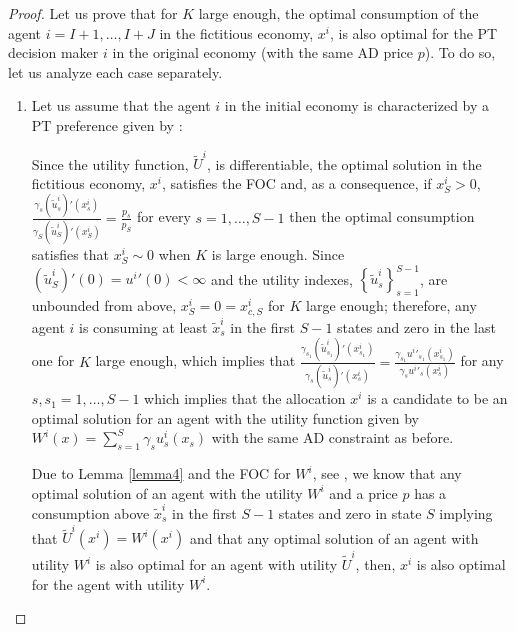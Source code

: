 \documentclass[pdftex]{article}
\numberwithin{equation}{section}
\theoremstyle{th}
\newtheorem{proof lemma}{{Proof Lemma}.}
\theoremstyle{definition}
\begin{document}
{\begin{proof}
Let us prove that for $K$ large enough, the optimal consumption
of the agent $i=I+1,\dots,I+J$ in the fictitious economy, $x^i$, is also optimal for the PT decision maker $i$ in the original
economy (with the same AD price $p$). To do so, let us analyze each case separately.
\begin{enumerate}
\item Let us assume that the agent $i$ in the initial economy is characterized
by a PT preference given by \cite{KT92}:

Since the utility function, $\tilde{U}^i$, is differentiable, the
optimal solution in the fictitious economy, $x^{i}$, satisfies
the FOC and, as a consequence, if $x_{S}^{i}>0$, $\frac{\gamma_{s}{\left(\tilde{u}_{s}^{i}\right)}'\left(x_{s}^{i}\right)}{\gamma_{S}{\left(\tilde{u}_{S}^{i}\right)}'\left(x_{S}^{i}\right)}=\frac{p_{s}}{p_{S}}$
for every $s=1,\dots,S-1$ then the optimal consumption satisfies that
$x_{S}^{i}\sim0$ when $K$ is large enough. Since $(\tilde{u}_{S}^{i})'(0)={u^{i}}'(0)<\infty$
and the utility indexes, $\left\{ \tilde{u}_{s}^{i}\right\} _{s=1}^{S-1}$,
are unbounded from above, $x_{S}^{i}=0=x_{c,S}^{i}$ for $K$ large
enough; therefore, any agent $i$ is consuming at least $\tilde{x}^{i}_s$
in the first $S-1$ states and zero in the last one for $K$ large
enough, which implies that $\frac{\gamma_{s_{1}}{\left(\tilde{u}_{s_{1}}^{i}\right)}'\left(x_{s_{1}}^{i}\right)}{\gamma_{s}{\left(\tilde{u}_{s}^{i}\right)}'\left(x_{s}^{i}\right)}=\frac{\gamma_{s_{1}}{u^{i}}'_{s_1}\left(x_{s_{1}}^{i}\right)}{\gamma_{s}{u^{i}}'_s\left(x_{s}^{i}\right)}$
for any $s,s_{1}=1,\dots,S-1$ which implies that the allocation $x^{i}$
is a candidate to be an optimal solution for an agent with the utility
function given by $W^{i}(x)=\sum_{s=1}^{S}\gamma_{s}u^{i}_s(x_{s})$
with the same AD constraint as before.

Due to Lemma \ref{lemma4}
and the FOC for $W^{i}$, see \cite{IS}, we know that any optimal
solution of an agent with the utility $W^{i}$ and a price $p$
has a consumption above $\tilde{x}^{i}_s$ in the first $S-1$ states
and zero in state $S$ implying that $\tilde{U}^{i}\left(x^{i}\right)=W^{i}\left(x^{i}\right)$ and that any optimal solution of an agent
with utility $W^{i}$ is also optimal for an agent with utility $\tilde{U}^{i}$, then, $x^{i}$ is also optimal for the agent with utility
$W^{i}$.


\end{enumerate}
\end{proof}}
\end{document}
